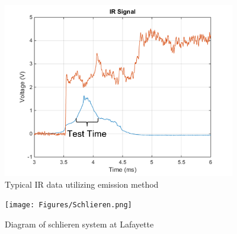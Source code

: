 \begin{figure}
\centering
\includegraphics[height = 3in]{Figures/IREmission.png}
\caption[Typical IR data utilizing emission method]{Typical IR data utilizing emission method}
\label{fig:IRemission}
\end{figure}

\begin{figure}
\centering
\texttt{[image: Figures/Schlieren.png]}
\caption[Schlieren Diagram]{Diagram of schlieren system at Lafayette}
\label{fig:schlieren}
\end{figure}